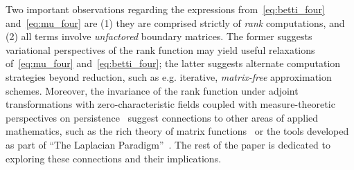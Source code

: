 \documentclass[10pt]{article}
\numberwithin{equation}{section}
\newcommand{\+}{%
	\raisebox{0.18ex}{\scaleobj{0.55}{+}}
}
\theoremstyle{definition}
\theoremstyle{definition}
\begin{document}
Two important observations regarding the expressions from~\eqref{eq:betti_four} and~\eqref{eq:mu_four} are (1) they are comprised strictly of \emph{rank} computations, and (2) all terms involve \emph{unfactored} boundary matrices.
The former suggests variational perspectives of the rank function may yield useful relaxations of~\eqref{eq:mu_four} and~\eqref{eq:betti_four}; the latter suggests alternate computation strategies beyond reduction, such as e.g. iterative, \emph{matrix-free} approximation schemes. 
Moreover, the invariance of the rank function under adjoint transformations with zero-characteristic fields coupled with measure-theoretic perspectives on persistence~\cite{chazal2016structure} suggest connections to other areas of applied mathematics, such as the rich theory of matrix functions~\cite{} or the tools developed as part of ``The Laplacian Paradigm''~\cite{}.
The rest of the paper is dedicated to exploring these connections and their implications. 
\end{document}
